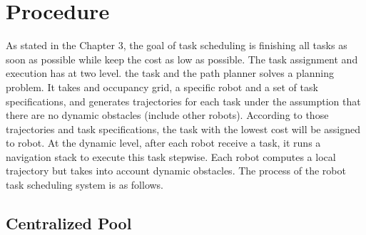 


\section{Procedure}
\label{sec:task_scheduling_procedure}
As stated in the Chapter 3, the goal of task scheduling is finishing all tasks as soon as possible while keep the cost as low as possible. 
The task assignment and execution has at two level. \cite{Ivan2017} the task and the path planner solves a planning problem. It takes and occupancy grid, a specific robot and a set of task specifications, and generates trajectories for each task under the assumption that there are no dynamic obstacles (include other robots). According to those trajectories and task specifications, the task with the lowest cost will be assigned to robot.
At the dynamic level, after each robot receive a task, it runs a navigation stack to execute this task stepwise. Each robot computes a local trajectory but takes into account dynamic obstacles.
The process of the robot task scheduling system is as follows.

\subsection{Centralized Pool}

